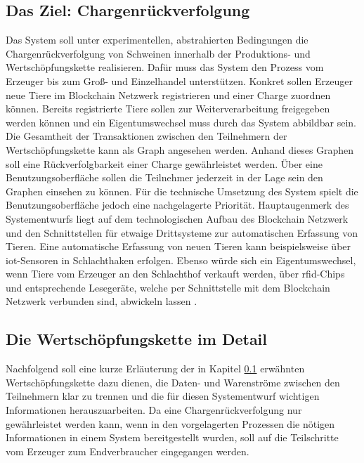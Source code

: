 \subsection{Das Ziel: Chargenrückverfolgung} \label{goal-description}
Das System soll unter experimentellen, abstrahierten Bedingungen die Chargenrückverfolgung von Schweinen innerhalb der Produktions- und Wertschöpfungskette realisieren. Dafür muss das System den Prozess vom Erzeuger bis zum Groß- und Einzelhandel unterstützen. Konkret sollen Erzeuger neue Tiere im Blockchain Netzwerk registrieren und einer Charge zuordnen können. Bereits registrierte Tiere sollen zur Weiterverarbeitung freigegeben werden können und ein Eigentumswechsel muss durch das System abbildbar sein. Die Gesamtheit der Transaktionen zwischen den Teilnehmern der Wertschöpfungskette kann als Graph angesehen werden. Anhand dieses Graphen soll eine Rückverfolgbarkeit einer Charge gewährleistet werden. Über eine Benutzungsoberfläche sollen die Teilnehmer jederzeit in der Lage sein den Graphen einsehen zu können. Für die technische Umsetzung des System spielt die Benutzungsoberfläche jedoch eine nachgelagerte Priorität. Hauptaugenmerk des Systementwurfs liegt auf dem technologischen Aufbau des Blockchain Netzwerk und den Schnittstellen für etwaige Drittsysteme zur automatischen Erfassung von Tieren. Eine automatische Erfassung von neuen Tieren kann beispielsweise über \ac{iot}-Sensoren in Schlachthaken erfolgen. Ebenso würde sich ein Eigentumswechsel, wenn Tiere vom Erzeuger an den Schlachthof verkauft werden, über \acs{rfid}-Chips und entsprechende Lesegeräte, welche per Schnittstelle mit dem Blockchain Netzwerk verbunden sind, abwickeln lassen \citep{Dorri2017, Samaniego2016}.

\subsection{Die Wertschöpfungskette im Detail}
Nachfolgend soll eine kurze Erläuterung der in Kapitel \ref{goal-description} erwähnten Wertschöpfungskette dazu dienen, die Daten- und Warenströme zwischen den Teilnehmern klar zu trennen und die für diesen Systementwurf wichtigen Informationen herauszuarbeiten. Da eine Chargenrückverfolgung nur gewährleistet werden kann, wenn in den vorgelagerten Prozessen die nötigen Informationen in einem System bereitgestellt wurden, soll auf die Teilschritte vom Erzeuger zum Endverbraucher eingegangen werden.

